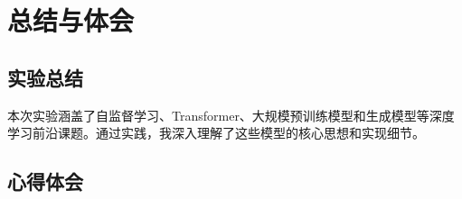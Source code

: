 \chapter{总结与体会}
\label{chap:summary}

\section{实验总结}
本次实验涵盖了自监督学习、Transformer、大规模预训练模型和生成模型等深度学习前沿课题。通过实践，我深入理解了这些模型的核心思想和实现细节。

\section{心得体会}
